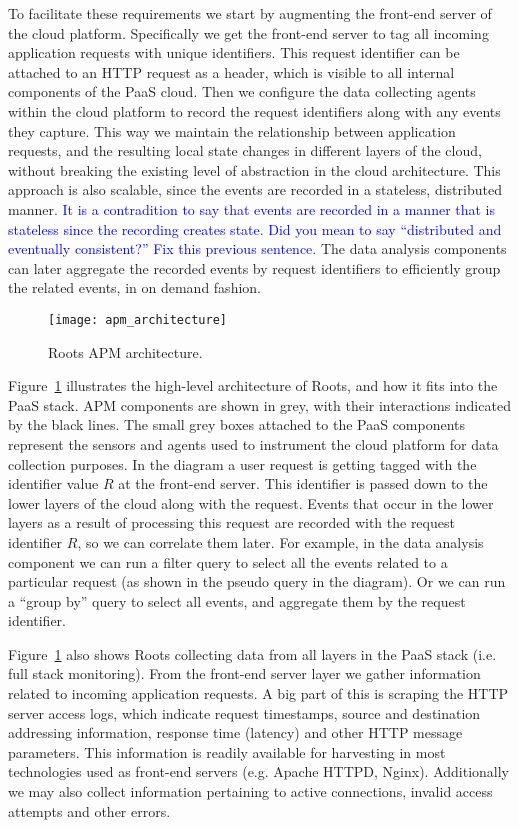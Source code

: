 To facilitate these requirements we start by augmenting the front-end server of the cloud platform. 
Specifically we get the front-end server to tag all incoming application requests with unique identifiers.
This request identifier can be attached to an HTTP request as a header, which is visible to all 
internal components of the PaaS cloud. Then we configure the data collecting agents within the 
cloud platform to record the request identifiers along with any events they capture. 
This way we maintain the relationship between application requests, and the resulting
local state changes in different layers of the cloud, without breaking the existing level
of abstraction in the cloud architecture. This approach is also scalable, since the events are
recorded in a stateless, distributed manner. \textcolor{blue}{It is a
contradition to say that events are recorded in a manner that is stateless
since the recording creates state.  Did you mean to say ``distributed and
eventually consistent?''  Fix this previous sentence.}
The data analysis components can later
aggregate the recorded events by request identifiers to efficiently group the related events,
in on demand fashion.

\begin{figure}
\centering
\texttt{[image: apm\_architecture]}
\caption{Roots APM architecture.}
\label{fig:apm_architecture}
\end{figure}

Figure~\ref{fig:apm_architecture} illustrates the high-level architecture of Roots, and how 
it fits into the PaaS stack. APM components are shown in grey, with their interactions indicated
by the black lines. The small grey boxes attached to the PaaS components represent the sensors and
agents used to instrument the cloud platform for data collection purposes. 
In the diagram a user request is getting tagged with the identifier value
$R$ at the front-end server. This identifier is passed down to the lower layers of the cloud
along with the request. Events that occur in the lower layers as a result of processing this request
are recorded with the request identifier $R$, so we can correlate them later. For example, in the 
data analysis component we can run a filter query to select all the events related to a particular
request (as shown in the pseudo query in the diagram). Or we can run a ``group by'' 
query to select all events, and aggregate them by the request identifier.

Figure~\ref{fig:apm_architecture} also shows Roots collecting data from all layers in the 
PaaS stack (i.e. full stack monitoring). 
From the front-end server layer we gather information related to incoming application
requests. A big part of this is scraping the HTTP server access logs, which indicate request timestamps,
source and destination addressing information, response time (latency) and other HTTP message
parameters. This information is readily available for harvesting in most technologies used as front-end
servers (e.g. Apache HTTPD, Nginx). Additionally we may also collect information pertaining to active
connections, invalid access attempts and other errors.

